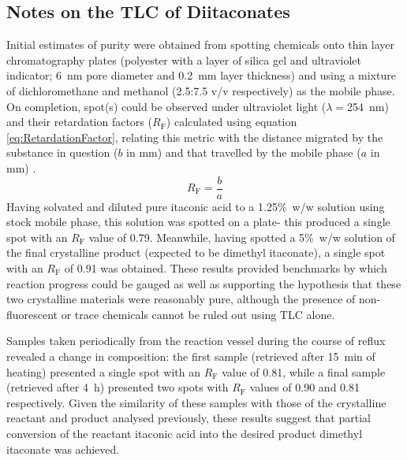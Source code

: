 \subsection{Notes on the TLC of Diitaconates}
\label{subsec:NoOnThTLCOfDii}
Initial estimates of purity were obtained from spotting chemicals onto
 thin layer chromatography plates (polyester with a layer of silica gel and
 ultraviolet indicator; 6~\unit{\nano\metre} pore diameter and
 0.2~\unit{\milli\metre} layer thickness) and using a mixture of
 dichloromethane and methanol (2.5:7.5 v/v respectively) as the mobile phase.
On completion, spot(s) could be observed under ultraviolet light
 (\(\lambda=\)254~\unit{\nano\metre}) and their retardation factors
 (\(R_{\mathrm{F}}\)) calculated using equation \ref{eq:RetardationFactor},
 relating this metric with the distance migrated by the substance in
 question (\(b\) in \unit{\milli\metre}) and that travelled by the
 mobile phase (\(a\) in \unit{\milli\metre}) \autocite{Ettre1993}.
\begin{equation}\label{eq:RetardationFactor}
    R_{\mathrm{F}}=\frac{b}{a}
\end{equation}
Having solvated and diluted pure itaconic acid to a 1.25\unit{\percent}~w/w
 solution using stock mobile phase, this solution was spotted on a plate- this
 produced a single spot with an \(R_{\mathrm{F}}\) value of 0.79.
Meanwhile, having spotted a 5\unit{\percent}~w/w solution of the final
 crystalline product (expected to be dimethyl itaconate), a single spot with
 an \(R_{\mathrm{F}}\) of 0.91 was obtained.
These results provided benchmarks by which reaction progress could be
 gauged as well as supporting the hypothesis that these two crystalline
 materials were reasonably pure, although the
 presence of non-fluorescent or trace chemicals cannot be ruled out
 using TLC alone.

Samples taken periodically from the reaction vessel during the course of
 reflux revealed a change in composition: the first sample
 (retrieved after 15~\unit{\minute} of heating) presented a single spot with
 an \(R_{\mathrm{F}}\) value of 0.81, while a final sample (retrieved after 
 4~\unit{\hour}) presented two spots with \(R_{\mathrm{F}}\) values of 0.90 and 0.81
 respectively.
Given the similarity of these samples with those of the crystalline
 reactant and product analysed previously, these results suggest that
 partial conversion of the reactant itaconic acid into the desired product
 dimethyl itaconate was achieved.

